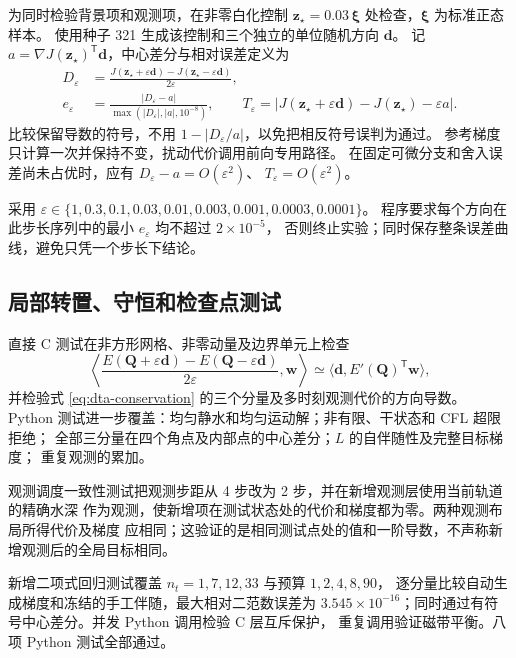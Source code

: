 \documentclass[12pt,a4paper]{article}
\newcommand{\Q}{\mathbf{Q}}
\newcommand{\trans}{^{\mathsf T}}
\begin{document}
为同时检验背景项和观测项，在非零白化控制
$\mathbf z_\star=0.03\,\boldsymbol\xi$ 处检查，$\boldsymbol\xi$ 为标准正态样本。
使用种子 321 生成该控制和三个独立的单位随机方向 $\mathbf d$。
记 $a=\nabla J(\mathbf z_\star)\trans\mathbf d$，中心差分与相对误差定义为
\begin{align}
 D_\varepsilon&=\frac{J(\mathbf z_\star+\varepsilon\mathbf d)
                    -J(\mathbf z_\star-\varepsilon\mathbf d)}{2\varepsilon},\nonumber\\
 e_\varepsilon&=\frac{|D_\varepsilon-a|}
 {\max(|D_\varepsilon|,|a|,10^{-8})},\qquad
 T_\varepsilon=|J(\mathbf z_\star+\varepsilon\mathbf d)-J(\mathbf z_\star)-\varepsilon a|.
 \label{eq:dta-gradient-check}
\end{align}
比较保留导数的符号，不用 $1-|D_\varepsilon/a|$，以免把相反符号误判为通过。
参考梯度只计算一次并保持不变，扰动代价调用前向专用路径。
在固定可微分支和舍入误差尚未占优时，应有 $D_\varepsilon-a=O(\varepsilon^2)$、
$T_\varepsilon=O(\varepsilon^2)$。

采用 $\varepsilon\in\{1,0.3,0.1,0.03,0.01,0.003,0.001,0.0003,0.0001\}$。
程序要求每个方向在此步长序列中的最小 $e_\varepsilon$ 均不超过 $2\times10^{-5}$，
否则终止实验；同时保存整条误差曲线，避免只凭一个步长下结论。

\subsection{局部转置、守恒和检查点测试}

直接 C 测试在非方形网格、非零动量及边界单元上检查
\begin{equation}
 \left\langle\frac{E(\Q+\varepsilon\mathbf d)-E(\Q-\varepsilon\mathbf d)}{2\varepsilon},
 \mathbf w\right\rangle
 \simeq\langle\mathbf d,E'(\Q)\trans\mathbf w\rangle,
 \label{eq:dta-dot-test}
\end{equation}
并检验式 \eqref{eq:dta-conservation} 的三个分量及多时刻观测代价的方向导数。
Python 测试进一步覆盖：均匀静水和均匀运动解；非有限、干状态和 CFL 超限拒绝；
全部三分量在四个角点及内部点的中心差分；$L$ 的自伴随性及完整目标梯度；
重复观测的累加。

观测调度一致性测试把观测步距从 4 步改为 2 步，并在新增观测层使用当前轨道的精确水深
作为观测，使新增项在测试状态处的代价和梯度都为零。两种观测布局所得代价及梯度
应相同；这验证的是相同测试点处的值和一阶导数，不声称新增观测后的全局目标相同。

新增二项式回归测试覆盖 $n_t=1,7,12,33$ 与预算 $1,2,4,8,90$，
逐分量比较自动生成梯度和冻结的手工伴随，最大相对二范数误差为
$3.545\times10^{-16}$；同时通过有符号中心差分。并发 Python 调用检验 C 层互斥保护，
重复调用验证磁带平衡。八项 Python 测试全部通过。
\end{document}

